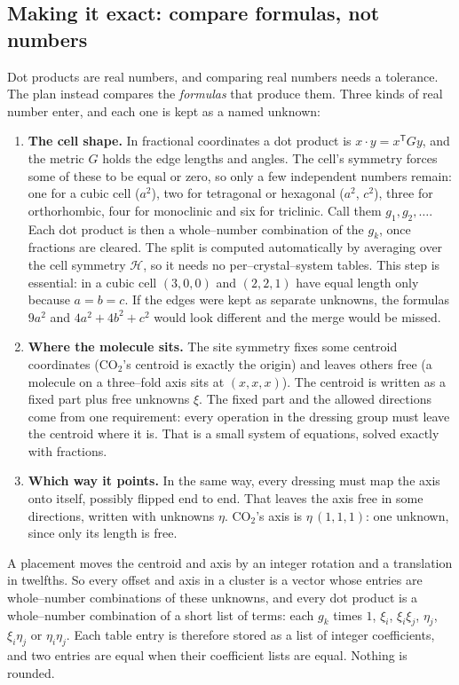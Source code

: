 \documentclass[11pt]{article}
\theoremstyle{definition}
\newcommand{\Hgrp}{\mathcal{H}}
\begin{document}
\subsection{Making it exact: compare formulas, not numbers}

Dot products are real numbers, and comparing real numbers needs a tolerance.
The plan instead compares the \emph{formulas} that produce them. Three kinds of
real number enter, and each one is kept as a named unknown:
\begin{enumerate}[leftmargin=2em]
\item \textbf{The cell shape.} In fractional coordinates a dot product is
  $x\cdot y=x^{\mathsf T}Gy$, and the metric $G$ holds the edge lengths and
  angles. The cell's symmetry forces some of these to be equal or zero, so
  only a few independent numbers remain: one for a cubic cell ($a^2$), two
  for tetragonal or hexagonal ($a^2$, $c^2$), three for orthorhombic, four for
  monoclinic and six for triclinic. Call them $g_1,g_2,\dots$. Each dot product
  is then a whole--number combination of the $g_k$, once fractions are cleared.
  The split is computed automatically by averaging over the cell symmetry
  $\Hgrp$, so it needs no per--crystal--system tables. This step is essential:
  in a cubic cell $(3,0,0)$ and $(2,2,1)$ have equal length only because
  $a=b=c$. If the edges were kept as separate unknowns, the formulas $9a^2$ and
  $4a^2+4b^2+c^2$ would look different and the merge would be missed.
\item \textbf{Where the molecule sits.} The site symmetry fixes some centroid
  coordinates (CO$_2$'s centroid is exactly the origin) and leaves others free
  (a molecule on a three--fold axis sits at $(x,x,x)$). The centroid is written
  as a fixed part plus free unknowns $\xi$. The fixed part and the allowed
  directions come from one requirement: every operation in the dressing group
  must leave the centroid where it is. That is a small system of equations,
  solved exactly with fractions.
\item \textbf{Which way it points.} In the same way, every dressing must map
  the axis onto itself, possibly flipped end to end. That leaves the axis free
  in some directions, written with unknowns $\eta$. CO$_2$'s axis is
  $\eta\,(1,1,1)$: one unknown, since only its length is free.
\end{enumerate}
A placement moves the centroid and axis by an integer rotation and a
translation in twelfths. So every offset and axis in a cluster is a vector
whose entries are whole--number combinations of these unknowns, and every dot
product is a whole--number combination of a short list of terms: each $g_k$
times $1$, $\xi_i$, $\xi_i\xi_j$, $\eta_j$, $\xi_i\eta_j$ or $\eta_i\eta_j$.
Each table entry is therefore stored as a list of integer coefficients, and two
entries are equal when their coefficient lists are equal. Nothing is rounded.
\end{document}
